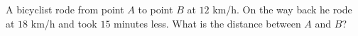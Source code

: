A bicyclist rode from point $A$ to point $B$ at $12$ km/h. On the way back he rode at $18$ km/h and took $15$ minutes less. What is the distance between $A$ and $B$?
